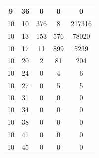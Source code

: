 \documentclass[a4paper,14pt]{extarticle}
\begin{document}
\begin{enumerate}[1.]
\begin{tabular}{|c|c|c|c|c|}
              9                                  & 36                                & 0                                       & 0             & 0      \\
              \hline
              10                                 & 10                                & 376                                     & 8             & 217316 \\
              \hline
              10                                 & 13                                & 153                                     & 576           & 78020  \\
              \hline
              10                                 & 17                                & 11                                      & 899           & 5239   \\
              \hline
              10                                 & 20                                & 2                                       & 81            & 204    \\
              \hline
              10                                 & 24                                & 0                                       & 4             & 6      \\
              \hline
              10                                 & 27                                & 0                                       & 5             & 5      \\
              \hline
              10                                 & 31                                & 0                                       & 0             & 0      \\
              \hline
              10                                 & 34                                & 0                                       & 0             & 0      \\
              \hline
              10                                 & 38                                & 0                                       & 0             & 0      \\
              \hline
              10                                 & 41                                & 0                                       & 0             & 0      \\
              \hline
              10                                 & 45                                & 0                                       & 0             & 0      \\
              \hline
          \end{tabular}


\end{enumerate}
\end{document}
